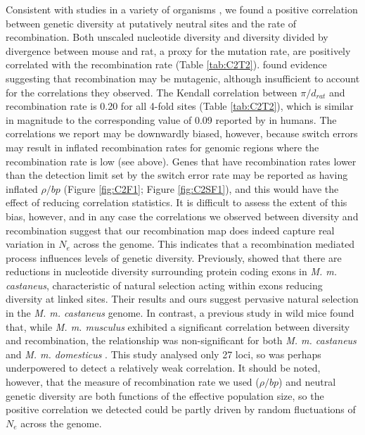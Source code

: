 	Consistent with studies in a variety of organisms \citep{RN117}, we found a positive correlation between genetic diversity at putatively neutral sites and the rate of recombination. Both unscaled nucleotide diversity and diversity divided by divergence between mouse and rat, a proxy for the mutation rate, are positively correlated with the recombination rate (Table \ref{tab:C2T2}). \cite{RN168} found evidence suggesting that recombination may be mutagenic, although insufficient to account for the correlations they observed. The Kendall correlation between $\pi/d_{rat}$ and recombination rate is 0.20 for all 4-fold sites (Table \ref{tab:C2T2}), which is similar in magnitude to the corresponding value of 0.09 reported by \cite{RN168} in humans. The correlations we report may be downwardly biased, however, because switch errors may result in inflated recombination rates for genomic regions where the recombination rate is low (see above). Genes that have recombination rates lower than the detection limit set by the switch error rate may be reported as having inflated $\rho /bp$ (Figure \ref{fig:C2F1}; Figure \ref{fig:C2SF1}), and this would have the effect of reducing correlation statistics. It is difficult to assess the extent of this bias, however, and in any case the correlations we observed between diversity and recombination suggest that our recombination map does indeed capture real variation in $N_e$ across the genome. This indicates that a recombination mediated process influences levels of genetic diversity. Previously, \cite{RN122} showed that there are reductions in nucleotide diversity surrounding protein coding exons in \textit{M. m. castaneus}, characteristic of natural selection acting within exons reducing diversity at linked sites. Their results and ours suggest pervasive natural selection in the \textit{M. m. castaneus} genome. In contrast, a previous study in wild mice found that, while \textit{M. m. musculus} exhibited a significant correlation between diversity and recombination, the relationship was non-significant for both \textit{M. m. castaneus} and \textit{M. m. domesticus} \citep{RN315}. This study analysed only 27 loci, so was perhaps underpowered to detect a relatively weak correlation. It should be noted, however, that the measure of recombination rate we used ($\rho /bp$) and neutral genetic diversity are both functions of the effective population size, so the positive correlation we detected could be partly driven by random fluctuations of $N_e$ across the genome.

